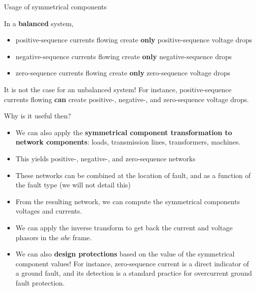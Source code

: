 \begin{frame}[allowframebreaks]{Usage of symmetrical components}

In a \textbf{balanced} system, 
\begin{itemize}
    \item \alert{positive-sequence} currents flowing create \textbf{only} \alert{positive-sequence} voltage drops 
    \item \alert{negative-sequence} currents flowing create \textbf{only} \alert{negative-sequence} drops 
    \item \alert{zero-sequence} currents flowing create \textbf{only} \alert{zero-sequence} voltage drops 
\end{itemize}

It is not the case for an unbalanced system!  For instance, positive-sequence currents flowing \textbf{can} create positive-, negative-, and zero-sequence voltage drops. 
    
Why is it useful then? 

\begin{itemize}
    \item We can also apply the \textbf{symmetrical component transformation to network components}: loads, transmission lines, transformers, machines. 
    \item This yields positive-, negative-, and zero-sequence networks
    \item These networks can be combined at the location of fault, and as a function of the fault type (we will not detail this)
    \item From the resulting network, we can compute the symmetrical components voltages and currents. 
    \item We can apply the inverse transform to get back the current and voltage phasors in the $abc$ frame.
    \item We can also \textbf{design protections} based on the value of the symmetrical component values! For instance, zero-sequence current is a direct indicator of a ground fault, and its detection is a standard practice for overcurrent ground fault protection.
\end{itemize}
\end{frame}

